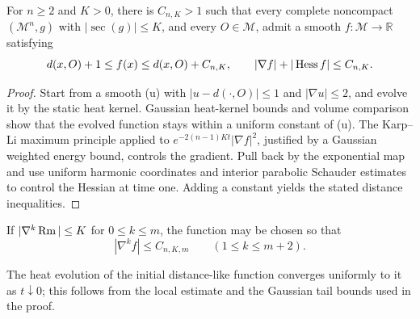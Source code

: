\begin{proposition}
\label{prop:chow-iii-distance-like-function-bounded-derivatives}
For \(n\ge2\) and \(K>0\), there is \(C_{n,K}>1\) such that every complete
noncompact \((\mathcal M^n,g)\) with \( |\sec(g)|\le K\), and every
\(O\in\mathcal M\), admit a smooth \(f:\mathcal M\to\mathbb R\) satisfying
\[
 d(x,O)+1\le f(x)\le d(x,O)+C_{n,K},
 \qquad |\nabla f|+|\operatorname{Hess} f|\le C_{n,K}.
\]
\end{proposition}
\begin{proof}
Start from a smooth (u) with \(|u-d(\cdot,O)|\le1\) and
\(|\nabla u|\le2\), and evolve it by the static heat kernel.  Gaussian
heat-kernel bounds and volume comparison show that the evolved function stays
within a uniform constant of (u).  The Karp--Li maximum principle applied
to \(e^{-2(n-1)Kt}|\nabla f|^2\), justified by a Gaussian weighted energy
bound, controls the gradient.  Pull back by the exponential map and use
uniform harmonic coordinates and interior parabolic Schauder estimates to
control the Hessian at time one.  Adding a constant yields the stated
distance inequalities.
\end{proof}

\begin{remark}
\label{rem:chow-iii-distance-like-function-higher-derivatives}
If \(|\nabla^k\operatorname{Rm}|\le K\) for \(0\le k\le m\), the function may be chosen so
that
\[
 |\nabla^kf|\le C_{n,K,m}\qquad(1\le k\le m+2).
\]
\end{remark}

\begin{remark}
\label{rem:chow-iii-distance-like-heat-evolution-uniform-convergence}
The heat evolution of the initial distance-like function converges uniformly
to it as \(t\downarrow0\); this follows from the local estimate and the
Gaussian tail bounds used in the proof.
\end{remark}

